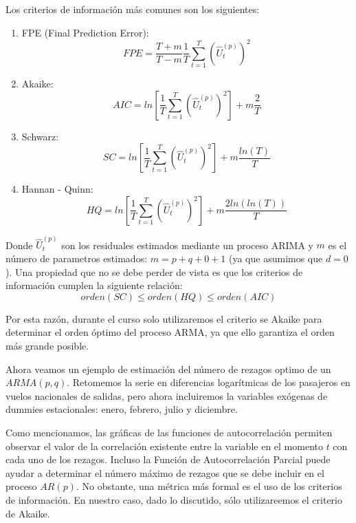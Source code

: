 \documentclass[
]{book}
\begin{document}
Los criterios de información más comunes son los siguientes:

\begin{enumerate}
\def\labelenumi{\arabic{enumi}.}
\item
  FPE (Final Prediction Error):
  \begin{equation}
   FPE = \frac{T+m}{T-m}\frac{1}{T}\sum_{t=1}^{T} \left( \hat{U}_t^{(p)} \right) ^2
  \end{equation}
\item
  Akaike:
  \begin{equation}
   AIC = ln \left[ \frac{1}{T} \sum_{t=1}^{T} \left( \hat{U}_t^{(p)} \right) ^2 \right] + m \frac{2}{T}
  \end{equation}
\item
  Schwarz:
  \begin{equation}
   SC = ln \left[ \frac{1}{T} \sum_{t=1}^{T} \left( \hat{U}_t^{(p)} \right) ^2 \right] + m \frac{ln(T)}{T}
  \end{equation}
\item
  Hannan - Quinn:
  \begin{equation}
   HQ = ln \left[ \frac{1}{T} \sum_{t=1}^{T} \left( \hat{U}_t^{(p)} \right) ^2 \right] + m \frac{2 ln(ln(T))}{T}
  \end{equation}
\end{enumerate}

Donde \(\hat{U}_t^{(p)}\) son los residuales estimados mediante un proceso ARIMA y \(m\) es el número de parametros estimados: \(m = p + q + 0 + 1\) (ya que asumimos que \(d = 0\)). Una propiedad que no se debe perder de vista es que los criterios de información cumplen la siguiente relación:
\begin{equation}
    orden(SC) \leq orden(HQ) \leq orden(AIC)
\end{equation}

Por esta razón, durante el curso solo utilizaremos el criterio se Akaike para determinar el orden óptimo del proceso ARMA, ya que ello garantiza el orden más grande posible.

Ahora veamos un ejemplo de estimación del número de rezagos optimo de un \(ARMA(p, q)\). Retomemos la serie en diferencias logarítmicas de los pasajeros en vuelos nacionales de salidas, pero ahora incluiremos la variables exógenas de dummies estacionales: enero, febrero, julio y diciembre.

Como mencionamos, las gráficas de las funciones de autocorrelación permiten observar el valor de la correlación existente entre la variable en el momento \(t\) con cada uno de los rezagos. Incluso la Función de Autocorrelación Parcial puede ayudar a determinar el número máximo de rezagos que se debe incluir en el proceso \(AR(p)\). No obstante, una métrica más formal es el uso de los criterios de información. En nuestro caso, dado lo discutido, sólo utilizareemos el criterio de Akaike.
\end{document}
